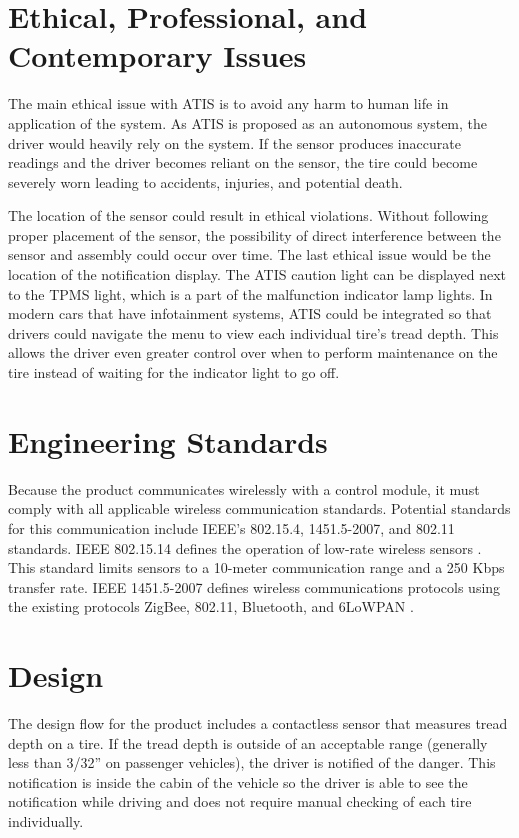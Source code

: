\documentclass[11pt]{IEEEtran}
\begin{document}
	\section{Ethical, Professional, and Contemporary Issues}
		The main ethical issue with ATIS is to avoid any harm to human life in application of the system. As ATIS is proposed as an autonomous system, the driver would heavily rely on the system. If the sensor produces inaccurate readings and the driver becomes reliant on the sensor, the tire could become severely worn leading to accidents, injuries, and potential death. 

		The location of the sensor could result in ethical violations. Without following proper placement of the sensor, the possibility of direct interference between the sensor and assembly could occur over time. The last ethical issue would be the location of the notification display. The ATIS caution light can be displayed next to the TPMS light, which is a part of the malfunction indicator lamp lights. In modern cars that have infotainment systems, ATIS could be integrated so that drivers could navigate the menu to view each individual tire's tread depth. This allows the driver even greater control over when to perform maintenance on the tire instead of waiting for the indicator light to go off.


	\section{Engineering Standards}
		Because the product communicates wirelessly with a control module, it must comply with all applicable wireless communication standards. Potential standards for this communication include IEEE’s 802.15.4, 1451.5-2007, and 802.11 standards. IEEE 802.15.14 defines the operation of low-rate wireless sensors \cite{80215standard}. This standard limits sensors to a 10-meter communication range and a 250 Kbps transfer rate. IEEE 1451.5-2007 defines wireless communications protocols using the existing protocols ZigBee, 802.11, Bluetooth, and 6LoWPAN \cite{1451standard}.

	\section{Design}
		\label{Design}
		The design flow for the product includes a contactless sensor that measures tread depth on a tire. If the tread depth is outside of an acceptable range (generally less than 3/32'' on passenger vehicles), the driver is notified of the danger. This notification is inside the cabin of the vehicle so the driver is able to see the notification while driving and does not require manual checking of each tire individually. 
\end{document}
